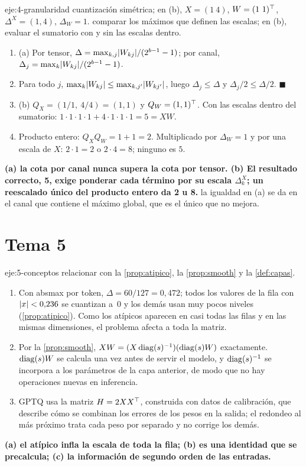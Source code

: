 \begin{solucion}{eje:4-granularidad}
\datos cuantización simétrica; en (b), $X=(1\ 4)$, $W=(1\ 1)^{\top}$, $\Delta^{X}=(1,4)$, $\Delta_W=1$.
\planteamiento comparar los máximos que definen las escalas; en (b), evaluar el sumatorio con y sin las escalas dentro.
\pasos
\begin{enumerate}[label=\arabic*.]
  \item (a) Por tensor, $\Delta=\max_{k,j}\lvert W_{kj}\rvert/(2^{b-1}-1)$; por canal, $\Delta_j=\max_k\lvert W_{kj}\rvert/(2^{b-1}-1)$.
  \item Para todo $j$, $\max_k\lvert W_{kj}\rvert\le\max_{k,j'}\lvert W_{kj'}\rvert$, luego $\Delta_j\le\Delta$ y $\Delta_j/2\le\Delta/2$. \hfill$\blacksquare$
  \item (b) $Q_X=(1/1,\ 4/4)=(1,1)$ y $Q_W=(1,1)^{\top}$. Con las escalas dentro del sumatorio: $1\cdot 1\cdot 1\cdot 1+4\cdot 1\cdot 1\cdot 1=5=XW$.
  \item Producto entero: $Q_XQ_W=1+1=2$. Multiplicado por $\Delta_W=1$ y por una escala de $X$: $2\cdot 1=2$ o $2\cdot 4=8$; ninguno es $5$.
\end{enumerate}
\resultado \textbf{(a) la cota por canal nunca supera la cota por tensor. (b) El resultado correcto, 5, exige ponderar cada término por su escala $\Delta^{X}_{k}$; un reescalado único del producto entero da 2 u 8.}
\comprobacion la igualdad en (a) se da en el canal que contiene el máximo global, que es el único que no mejora.
\end{solucion}

\section{Tema 5}

\begin{solucion}{eje:5-conceptos}
\planteamiento relacionar con la \cref{prop:atipico}, la \cref{prop:smooth} y la \cref{def:capas}.
\pasos
\begin{enumerate}[label=(\alph*)]
  \item Con absmax por token, $\Delta=60/127=0{,}472$; todos los valores de la fila con $\lvert x\rvert<0{,}236$ se cuantizan a~0 y los demás usan muy pocos niveles (\cref{prop:atipico}). Como los atípicos aparecen en casi todas las filas y en las mismas dimensiones, el problema afecta a toda la matriz.
  \item Por la \cref{prop:smooth}, $XW=(X\operatorname{diag}(s)^{-1})(\operatorname{diag}(s)W)$ exactamente. $\operatorname{diag}(s)W$ se calcula una vez antes de servir el modelo, y $\operatorname{diag}(s)^{-1}$ se incorpora a los parámetros de la capa anterior, de modo que no hay operaciones nuevas en inferencia.
  \item GPTQ usa la matriz $H=2XX^{\top}$, construida con datos de calibración, que describe cómo se combinan los errores de los pesos en la salida; el redondeo al más próximo trata cada peso por separado y no corrige los demás.
\end{enumerate}
\resultado \textbf{(a) el atípico infla la escala de toda la fila; (b) es una identidad que se precalcula; (c) la información de segundo orden de las entradas.}
\end{solucion}


